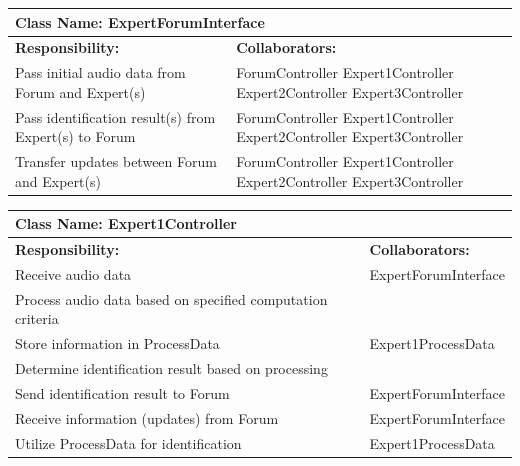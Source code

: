 \documentclass[]{article}
\begin{document}
\newpage
	\begin{table}[ht]
		\centering
		\begin{tabular}{|p{5cm}|p{5cm}|}
		\hline 
		 \multicolumn{2}{|l|}{\textbf{Class Name: ExpertForumInterface}} \\
		\hline
		\textbf{Responsibility:} & \textbf{Collaborators:} \\
		\hline
		Pass initial audio data from Forum and Expert(s) & ForumController \mbox{Expert1Controller} \mbox{Expert2Controller} \mbox{Expert3Controller} \\
		\hline
		Pass identification result(s) from Expert(s) to Forum & ForumController \mbox{Expert1Controller} \mbox{Expert2Controller} \mbox{Expert3Controller} \\
		\hline
		Transfer updates between Forum and Expert(s) & ForumController \mbox{Expert1Controller} \mbox{Expert2Controller} \mbox{Expert3Controller} \\
		\hline
		\end{tabular}
	\end{table}
	
	\begin{table}[ht]
		\centering
		\begin{tabular}{|p{5cm}|p{5cm}|}
		\hline 
		 \multicolumn{2}{|l|}{\textbf{Class Name: Expert1Controller}} \\
		\hline
		\textbf{Responsibility:} & \textbf{Collaborators:} \\
		\hline
		Receive audio data & ExpertForumInterface \\
		\hline
		Process audio data based on specified computation criteria &  \\
		\hline
		Store information in ProcessData & Expert1ProcessData \\
		\hline
		Determine identification result based on processing &  \\
		\hline
		Send identification result to Forum & ExpertForumInterface \\
		\hline
		Receive information (updates) from Forum & ExpertForumInterface \\
		\hline
		Utilize ProcessData for identification & Expert1ProcessData \\
		\hline
		\end{tabular}
	\end{table}
	
\end{document}
